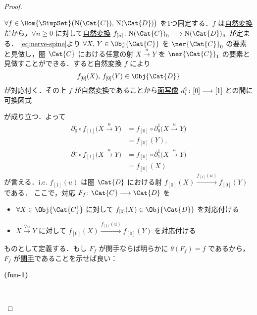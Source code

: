 \documentclass[TQFT_main]{subfiles}
\begin{document}
\begin{proof}
\begin{description}
        $\forall f \in \Hom{\SimpSet} \bigl( \mathrm{N}(\Cat{C}),\, \mathrm{N}(\Cat{D}) \bigr)$ を1つ固定する．$f$ は\hyperref[def:nat]{自然変換}だから，$\forall n \ge 0$ に対して\hyperref[def:nat]{自然変換} $f_{[n]} \colon \mathrm{N}(\Cat{C})_n \lto \mathrm{N}(\Cat{D})_n$ が定まる．
        \eqref{eq:nerve-spine}より $\forall X,\, Y \in \Obj{\Cat{C}}$ を $\ner{\Cat{C}}_0$ の要素と見做し，圏 $\Cat{C}$ における任意の射 $X \xrightarrow{u} Y$ を $\ner{\Cat{C}}_1$ の要素と見做すことができる．すると自然変換 $f$ により
        \begin{align}
            f_{[0]} (X),\, f_{[0]} (Y) \in \Obj{\Cat{D}}
        \end{align}
        が対応付く．その上 $f$ が自然変換であることから\hyperref[def:simplex-cat]{面写像} $d_i^1 \colon [0] \longrightarrow [1]$ との間に可換図式
        \begin{center}
        \end{center}
        が成り立つ．よって
        \begin{align}
            \partial_0^1 \circ f_{[1]}\bigl( X \xrightarrow{u} Y \bigr) 
            &= f_{[0]} \circ \partial_0^1 \bigl( X \xrightarrow{u} Y \bigr)  \\
            &= f_{[0]} (Y), \\
            \partial_1^1 \circ f_{[1]}\bigl( X \xrightarrow{u} Y \bigr) 
            &= f_{[0]} \circ \partial_1^1 \bigl( X \xrightarrow{u} Y \bigr) \\
            &= f_{[0]} (X)
        \end{align}
        が言える．i.e. $f_{[1]}(u)$ は圏 $\Cat{D}$ における射 $f_{[0]}(X) \xrightarrow{f_{[1]}(u)} f_{[0]} (Y)$ である．
        ここで，対応 $F_f \colon \Cat{C} \lto \Cat{D}$ を
        \begin{itemize}
            \item $\forall X \in \Obj{\Cat{C}}$ に対して $f_{[0]}(X) \in \Obj{\Cat{D}}$ を対応付ける
            \item $X \xrightarrow{\forall u} Y$ に対して $f_{[0]}(X) \xrightarrow{f_{[1]}(u)} f_{[0]}(Y)$ を対応付ける
        \end{itemize}
        ものとして定義する．もし $F_f$ が関手ならば明らかに $\theta(F_f) = f$ であるから，$F_f$ が\hyperref[def:functor]{関手}であることを示せば良い：
        \begin{description}
            \item[\textbf{(fun-1)}]　
            

\end{description}
\end{description}
\end{proof}
\end{document}
